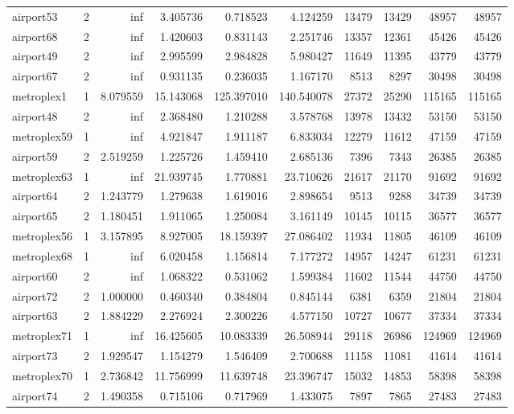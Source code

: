 \begin{longtable}{|l|r|r|r|r|r|r|r|r|r|}
airport53 & 2 & inf & 3.405736 & 0.718523 & 4.124259 & 13479 & 13429 & 48957 & 48957 \\
airport68 & 2 & inf & 1.420603 & 0.831143 & 2.251746 & 13357 & 12361 & 45426 & 45426 \\
airport49 & 2 & inf & 2.995599 & 2.984828 & 5.980427 & 11649 & 11395 & 43779 & 43779 \\
airport67 & 2 & inf & 0.931135 & 0.236035 & 1.167170 & 8513 & 8297 & 30498 & 30498 \\
metroplex1 & 1 & 8.079559 & 15.143068 & 125.397010 & 140.540078 & 27372 & 25290 & 115165 & 115165 \\
airport48 & 2 & inf & 2.368480 & 1.210288 & 3.578768 & 13978 & 13432 & 53150 & 53150 \\
metroplex59 & 1 & inf & 4.921847 & 1.911187 & 6.833034 & 12279 & 11612 & 47159 & 47159 \\
airport59 & 2 & 2.519259 & 1.225726 & 1.459410 & 2.685136 & 7396 & 7343 & 26385 & 26385 \\
metroplex63 & 1 & inf & 21.939745 & 1.770881 & 23.710626 & 21617 & 21170 & 91692 & 91692 \\
airport64 & 2 & 1.243779 & 1.279638 & 1.619016 & 2.898654 & 9513 & 9288 & 34739 & 34739 \\
airport65 & 2 & 1.180451 & 1.911065 & 1.250084 & 3.161149 & 10145 & 10115 & 36577 & 36577 \\
metroplex56 & 1 & 3.157895 & 8.927005 & 18.159397 & 27.086402 & 11934 & 11805 & 46109 & 46109 \\
metroplex68 & 1 & inf & 6.020458 & 1.156814 & 7.177272 & 14957 & 14247 & 61231 & 61231 \\
airport60 & 2 & inf & 1.068322 & 0.531062 & 1.599384 & 11602 & 11544 & 44750 & 44750 \\
airport72 & 2 & 1.000000 & 0.460340 & 0.384804 & 0.845144 & 6381 & 6359 & 21804 & 21804 \\
airport63 & 2 & 1.884229 & 2.276924 & 2.300226 & 4.577150 & 10727 & 10677 & 37334 & 37334 \\
metroplex71 & 1 & inf & 16.425605 & 10.083339 & 26.508944 & 29118 & 26986 & 124969 & 124969 \\
airport73 & 2 & 1.929547 & 1.154279 & 1.546409 & 2.700688 & 11158 & 11081 & 41614 & 41614 \\
metroplex70 & 1 & 2.736842 & 11.756999 & 11.639748 & 23.396747 & 15032 & 14853 & 58398 & 58398 \\
airport74 & 2 & 1.490358 & 0.715106 & 0.717969 & 1.433075 & 7897 & 7865 & 27483 & 27483 \\

\end{longtable}
